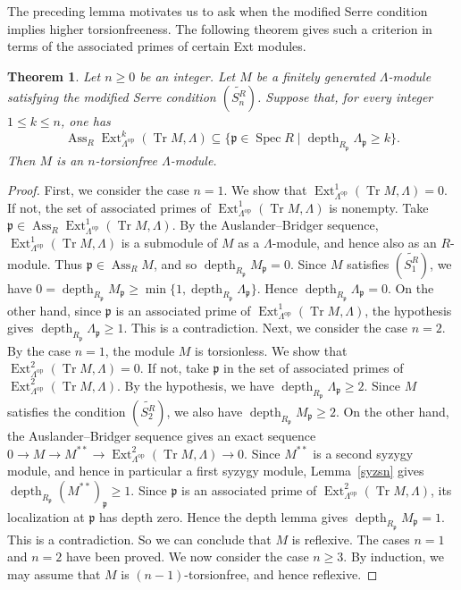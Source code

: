 \documentclass{amsart}
\newtheorem{thm}{Theorem}[section]
\theoremstyle{definition}
\theoremstyle{remark}
\numberwithin{equation}{thm}
\def\ass{\operatorname{Ass}}
\def\depth{\operatorname{depth}}
\def\Ext{\operatorname{Ext}}
\def\ge{\geqslant}
\def\le{\leqslant}
\def\p{\mathfrak{p}}
\def\spec{\operatorname{Spec}}
\def\tr{\operatorname{Tr}}
\begin{document}
The preceding lemma motivates us to ask when the modified Serre condition implies higher torsionfreeness. The following theorem gives such a criterion in terms of the associated primes of certain Ext modules.

\begin{thm}\label{SerreAss}
Let $n\ge0$ be an integer.
Let $M$ be a finitely generated $\Lambda$-module satisfying the modified Serre condition $(\widetilde{S_n^R})$. Suppose that, for every integer $1\le k\le n$, one has $$\ass_R\Ext^k_{\Lambda^{\mathrm{op}}}(\tr M,\Lambda)\subseteq\{\p\in\spec R\mid \depth_{R_\p}\Lambda_\p\ge k\}.$$
Then $M$ is an $n$-torsionfree $\Lambda$-module.
\end{thm}

\begin{proof}
First, we consider the case $n=1$. We show that $\Ext^1_{\Lambda^{\mathrm{op}}}(\tr M,\Lambda)=0$.
If not, the set of associated primes of $\Ext^1_{\Lambda^{\mathrm{op}}}(\tr M,\Lambda)$ is nonempty.
Take $\p\in\ass_R\Ext^1_{\Lambda^{\mathrm{op}}}(\tr M,\Lambda)$.
By the Auslander--Bridger sequence, $\Ext^1_{\Lambda^{\mathrm{op}}}(\tr M,\Lambda)$ is a submodule of $M$ as a $\Lambda$-module, and hence also as an $R$-module.
Thus $\p\in\ass_R M$, and so $\depth_{R_\p}M_\p=0$. Since $M$ satisfies $(\widetilde{S_1^R})$, we have $0=\depth_{R_\p}M_\p\ge\min\{1,\depth_{R_\p}\Lambda_\p\}$. Hence $\depth_{R_\p}\Lambda_\p=0$. On the other hand, since $\p$ is an associated prime of $\Ext^1_{\Lambda^{\mathrm{op}}}(\tr M,\Lambda)$, the hypothesis gives $\depth_{R_\p}\Lambda_\p\ge1$.
This is a contradiction.
Next, we consider the case $n=2$. By the case $n=1$, the module $M$ is torsionless.
We show that $\Ext^2_{\Lambda^{\mathrm{op}}}(\tr M,\Lambda)=0$.
If not, take $\p$ in the set of associated primes of $\Ext^2_{\Lambda^{\mathrm{op}}}(\tr M,\Lambda)$.
By the hypothesis, we have $\depth_{R_\p}\Lambda_\p\ge2$. Since $M$ satisfies the condition $(\widetilde{S_2^R})$, we also have $\depth_{R_\p}M_\p\ge2$.
On the other hand, the Auslander--Bridger sequence gives an exact sequence $0\to M\to M^{\ast\ast}\to\Ext^2_{\Lambda^{\mathrm{op}}}(\tr M,\Lambda)\to0$.
Since $M^{\ast\ast}$ is a second syzygy module, and hence in particular a first syzygy module, Lemma~\ref{syzsn} gives $\depth_{R_\p}(M^{\ast\ast})_\p\ge1$. Since $\p$ is an associated prime of $\Ext^2_{\Lambda^{\mathrm{op}}}(\tr M,\Lambda)$, its localization at $\p$ has depth zero. Hence the depth lemma gives $\depth_{R_\p}M_\p=1$. This is a contradiction. So we can conclude that $M$ is reflexive.
The cases $n=1$ and $n=2$ have been proved. We now consider the case $n\ge3$. By induction, we may assume that $M$ is $(n-1)$-torsionfree, and hence reflexive.

\end{proof}
\end{document}
